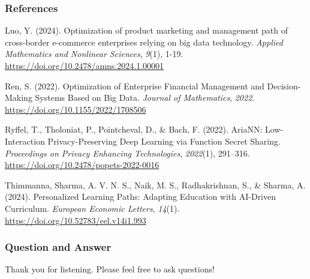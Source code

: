 \documentclass{beamer}
\begin{document}
\begin{frame}
\frametitle{References}

\footnotesize
\begin{thebibliography}{5}

 Luo, Y. (2024). Optimization of product marketing and management path of cross-border e-commerce enterprises relying on big data technology. \emph{Applied Mathematics and Nonlinear Sciences}, \emph{9}(1), 1-19. \href{https://doi.org/10.2478/amns.2024.1.00001}{https://doi.org/10.2478/amns.2024.1.00001}

 Ren, S. (2022). Optimization of Enterprise Financial Management and Decision-Making Systems Based on Big Data. \emph{Journal of Mathematics}, \emph{2022}. \href{https://doi.org/10.1155/2022/1708506}{https://doi.org/10.1155/2022/1708506}

 Ryffel, T., Tholoniat, P., Pointcheval, D., \& Bach, F. (2022). AriaNN: Low-Interaction Privacy-Preserving Deep Learning via Function Secret Sharing. \emph{Proceedings on Privacy Enhancing Technologies}, \emph{2022}(1), 291–316. \href{https://doi.org/10.2478/popets-2022-0016}{https://doi.org/10.2478/popets-2022-0016}

 Thimmanna, Sharma, A. V. N. S., Naik, M. S., Radhakrishnan, S., \& Sharma, A. (2024). Personalized Learning Paths: Adapting Education with AI-Driven Curriculum. \emph{European Economic Letters}, \emph{14}(1). \href{https://doi.org/10.52783/eel.v14i1.993}{https://doi.org/10.52783/eel.v14i1.993}

\end{thebibliography}
\normalsize
\end{frame}



\begin{frame}
\frametitle{Question and Answer}
{\Large Thank you for listening. Please feel free to ask questions!}
\end{frame}
\end{document}
